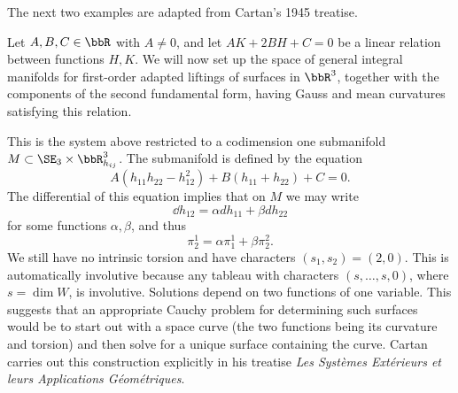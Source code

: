 The next two examples are adapted from Cartan's 1945 treatise.
\begin{example}\label{ex Weingarten surfaces}
    Let $A,B,C\in\bbR$ with $A\neq 0$, and let $AK+2BH+C=0$ be a linear relation between functions $H,K$. We will now set up the space of general integral manifolds for first-order adapted liftings of surfaces in $\bbR^3$, together with the components of the second fundamental form, having Gauss and mean curvatures satisfying this relation.

    This is the system above restricted to a codimension one submanifold $M\subset \SE_3\times \bbR^3_{h_{ij}}$. The submanifold is defined by the equation 
    \[A(h_{11}h_{22}-h_{12}^2)+B(h_{11}+h_{22})+C=0.\]
    The differential of this equation implies that on $M$ we may write 
    \[\dd h_{12}=\alpha d h_{11}+\beta dh_{22}\]
    for some functions $\alpha,\beta$, and thus 
    \[\pi^1_2=\alpha\pi^1_1+\beta\pi^2_2.\]
    We still have no intrinsic torsion and have characters $(s_1,s_2)=(2,0)$.  This is automatically involutive because any tableau with characters $(s,\ldots,s,0)$, where $s=\dim W$, is involutive. Solutions depend on two functions of one variable. This suggests that an appropriate Cauchy problem for determining such surfaces would be to start out with a space curve (the two functions being its curvature and torsion) and then solve for a unique surface containing the curve. Cartan carries out this construction explicitly in his treatise \emph{Les Syst\`emes Ext\'erieurs et leurs Applications G\'eom\'etriques}.
\end{example} 

